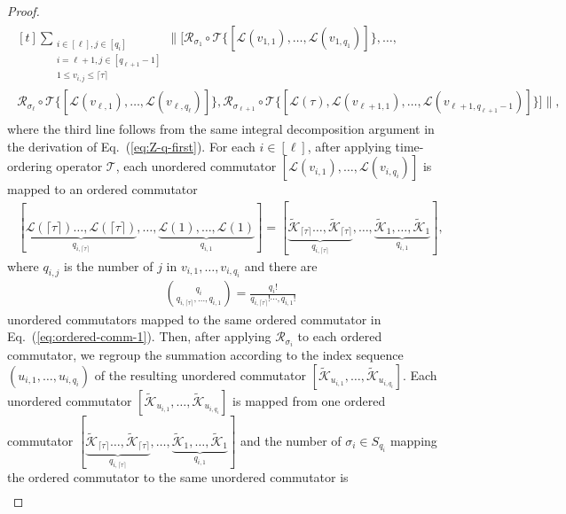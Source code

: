 \documentclass[11pt]{article}
\newcommand{\eq}[1]{(\ref{eq:#1})}
\newcommand{\mc}{\mathcal}
\begin{document}
\begin{proof}
\begin{align}
\begin{multlined}[t]
        \sum_{\substack{
            i\in[\ell], j\in[q_i] \\
            i=\ell+1, j\in[q_{\ell+1}-1] \\
            1\le v_{i,j} \le \lceil\tau\rceil
        }} \bigg\| \Big[ \mc R_{\sigma_1}\circ \mc T\big\{[\mc L(v_{1,1}), \ldots, \mc L(v_{1,q_1})]\big\}, \ldots, \\
        \mc R_{\sigma_\ell}\circ \mc T\big\{[\mc L(v_{\ell,1}), \ldots, \mc L(v_{\ell,q_\ell})]\big\},  
        \mc R_{\sigma_{\ell+1}}\circ \mc T\big\{[\mc L(\tau), \mc L(v_{\ell+1,1}), \ldots, \mc L(v_{\ell+1,q_{\ell+1}-1})]\big\} \Big] \bigg\|,\label{eq:bound-Xk}
    \end{multlined} 
\end{align}
where the third line follows from the same integral decomposition argument in the derivation of Eq.~\eq{Z-q-first}. For each $i\in[\ell]$, after applying time-ordering operator $\mc T$, each unordered commutator $[\mc L(v_{i,1}), \ldots, \mc L(v_{i,q_i})]$ is mapped to an ordered commutator \begin{align}
\label{eq:ordered-comm-1}
    [\underbrace{\mc L(\lceil\tau\rceil) \ldots,\mc L(\lceil\tau\rceil)}_{q_{i,\lceil\tau\rceil}},   \ldots, \underbrace{\mc L(1),  \ldots, \mc L(1)}_{q_{i,1}}] = [\underbrace{\tilde{\mc K}_{\lceil\tau\rceil} \ldots,\tilde{\mc K}_{\lceil\tau\rceil}}_{q_{i,\lceil\tau\rceil}},   \ldots, \underbrace{\tilde{\mc K}_{1},  \ldots, \tilde{\mc K}_{1}}_{q_{i,1}}],
\end{align}
where $q_{i,j}$ is the number of $j$ in $v_{i,1}, \ldots, v_{i,q_i}$ and there are \begin{align*}
    \binom{q_i}{q_{i, \lceil\tau\rceil}, \ldots, q_{i,1}} = \frac{q_i!}{q_{i, \lceil\tau\rceil}! \cdots, q_{i,1}!}
\end{align*}
unordered commutators mapped to the same  ordered commutator in Eq.~\eq{ordered-comm-1}. Then, after applying $\mc R_{\sigma_i}$ to each ordered commutator, we regroup the summation according to the index sequence $(u_{i,1}, \ldots, u_{i,q_i})$ of the resulting unordered commutator $[\tilde{\mc K}_{u_{i,1}},\ldots, \tilde{\mc K}_{u_{i,q_i}}]$. Each unordered commutator $[\tilde{\mc K}_{u_{i,1}},\ldots, \tilde{\mc K}_{u_{i,q_i}}]$ is mapped from one ordered commutator $[\underbrace{\tilde{\mc K}_{\lceil\tau\rceil} \ldots,\tilde{\mc K}_{\lceil\tau\rceil}}_{q_{i,\lceil\tau\rceil}},   \ldots, \underbrace{\tilde{\mc K}_{1},  \ldots, \tilde{\mc K}_{1}}_{q_{i,1}}]$ and the number of $\sigma_i\in S_{q_i}$ mapping the ordered commutator to the same unordered commutator is \begin{align*}

\end{align*}
\end{proof}
\end{document}
